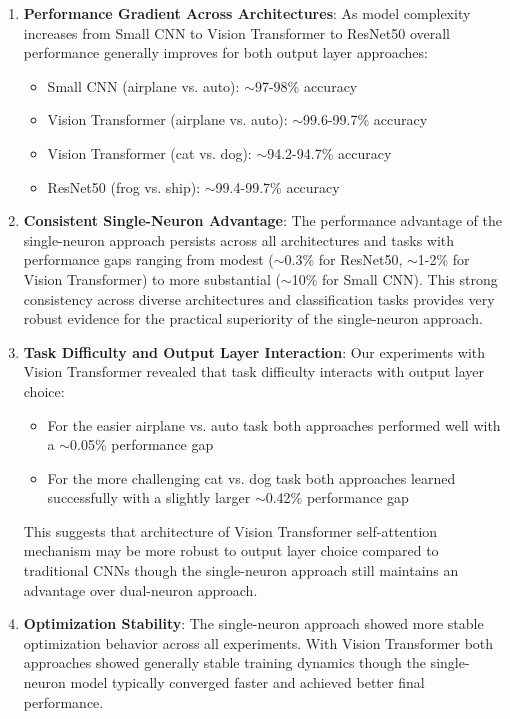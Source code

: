 \documentclass[11pt]{article}
\begin{document}
\begin{enumerate}
\item \textbf{Performance Gradient Across Architectures}: As model complexity increases from Small CNN to Vision Transformer to ResNet50 overall performance generally improves for both output layer approaches:
  \begin{itemize}
  \item Small CNN (airplane vs. auto): $\sim$97-98\% accuracy
  \item Vision Transformer (airplane vs. auto): $\sim$99.6-99.7\% accuracy
  \item Vision Transformer (cat vs. dog): $\sim$94.2-94.7\% accuracy
  \item ResNet50 (frog vs. ship): $\sim$99.4-99.7\% accuracy
  \end{itemize}

\item \textbf{Consistent Single-Neuron Advantage}: The performance advantage of the single-neuron approach persists across all architectures and tasks with performance gaps ranging from modest ($\sim$0.3\% for ResNet50, $\sim$1-2\% for Vision Transformer) to more substantial ($\sim$10\% for Small CNN). This strong consistency across diverse architectures and classification tasks provides very robust evidence for the practical superiority of the single-neuron approach.

\item \textbf{Task Difficulty and Output Layer Interaction}: Our experiments with Vision Transformer revealed that task difficulty interacts with output layer choice:
  \begin{itemize}
  \item For the easier airplane vs. auto task both approaches performed well with a $\sim$0.05\% performance gap
  \item For the more challenging cat vs. dog task both approaches learned successfully with a slightly larger $\sim$0.42\% performance gap
  \end{itemize}
  
  This suggests that architecture of Vision Transformer self-attention mechanism may be more robust to output layer choice compared to traditional CNNs though the single-neuron approach still maintains an advantage over dual-neuron approach.

\item \textbf{Optimization Stability}: The single-neuron approach showed more stable optimization behavior across all experiments. With Vision Transformer both approaches showed generally stable training dynamics though the single-neuron model typically converged faster and achieved better final performance.


\end{enumerate}
\end{document}
